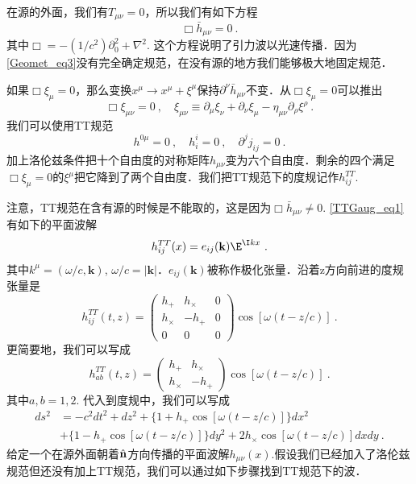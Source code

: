 
\begin{issues}
\issueNeedCite
\issueMissDepend
\end{issues}

在源的外面，我们有$T_{\mu\nu} = 0$，所以我们有如下方程
\begin{equation}\label{TTGaug_eq1}
\Box \bar h_{\mu\nu} = 0 ~.
\end{equation}
其中$\Box = - (1/c^2) \partial_0^2 +\nabla^2$. 这个方程说明了引力波以光速传播．因为\autoref{Geomet_eq3}没有完全确定规范，在没有源的地方我们能够极大地固定规范．

如果$\Box \xi_\mu = 0$，那么变换$x^\mu \rightarrow x^\mu+\xi^\mu$保持$\partial^\nu \bar h_{\mu\nu}$不变．从$\Box \xi_\mu = 0$可以推出
\begin{equation}
\Box \xi_{\mu\nu} = 0~, \quad \xi_{\mu\nu} \equiv \partial_{\mu} \xi_\nu +\partial_\nu \xi_\mu - \eta_{\mu\nu} \partial_\rho\xi^\rho~. 
\end{equation}
我们可以使用TT规范
\begin{equation}
h^{0\mu} = 0~, \quad h^i_i = 0~, \quad \partial^j j_{ij} = 0~.
\end{equation}
加上洛伦兹条件把十个自由度的对称矩阵$h_{\mu\nu}$变为六个自由度．剩余的四个满足$\Box \xi_\mu = 0$的$\xi^\mu$把它降到了两个自由度．我们把TT规范下的度规记作$h_{ij}^{TT}$. 

注意，TT规范在含有源的时候是不能取的，这是因为$\Box \bar h_{\mu\nu} \neq 0$. \autoref{TTGaug_eq1}有如下的平面波解
\begin{equation}
h_{ij}^{TT} (x) = e_{ij} (\mathbf k) \E^{\I kx} ~.  
\end{equation}
其中$k^\mu = (\omega/c,\mathbf k)$, $\omega/c = |\mathbf k|$．$e_{ij}(\mathbf k)$被称作极化张量．沿着z方向前进的度规张量是
\begin{equation}
h_{ij}^{TT} (t,z) = 
\begin{pmatrix}
h_+ & h_\times & 0 \\
h_\times & - h_+ & 0 \\
0 & 0 & 0
\end{pmatrix} \cos [\omega (t - z/c)]~. 
\end{equation}
更简要地，我们可以写成
\begin{equation}\label{TTGaug_eq2}
h_{ab}^{TT} (t,z) = 
\begin{pmatrix}
h_+ & h_\times   \\
h_\times & - h_+   
\end{pmatrix} \cos [\omega (t - z/c)]~. 
\end{equation}
其中$a,b = 1,2$. 代入到度规中，我们可以写成
\begin{equation}
\begin{aligned}
ds^2 & = - c^2 dt^2 + dz^2 + \{ 1+ h_+ \cos [\omega(t-z/c)] \} dx^2 \\
& + \{ 1-h_+ \cos [\omega(t-z/c)] \} dy^2 + 2 h_\times \cos[\omega(t-z/c)] dx dy~.
\end{aligned}
\end{equation}
给定一个在源外面朝着$\hat{\bf{n}}$方向传播的平面波解$h_{\mu\nu}(x)$.假设我们已经加入了洛伦兹规范但还没有加上TT规范，我们可以通过如下步骤找到TT规范下的波．

